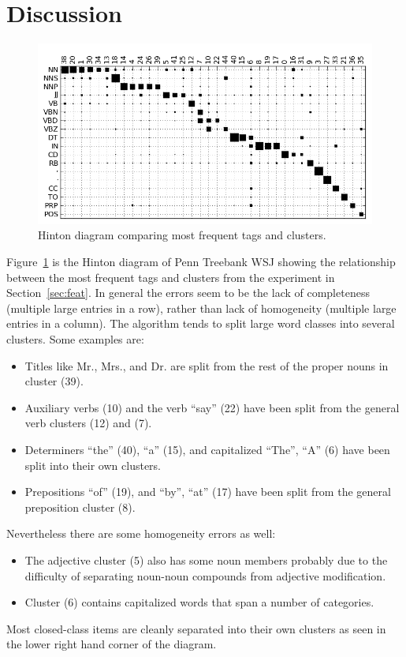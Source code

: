 \section{Discussion}
\label{sec:discuss}
\begin{figure}[ht] \centering
\includegraphics[width=\textwidth]{hinton.png}
\caption{Hinton diagram comparing most frequent tags and clusters.}
\label{plot-hinton}
\end{figure}

Figure~\ref{plot-hinton} is the Hinton diagram of Penn Treebank WSJ
showing the relationship between the most frequent tags and clusters
from the experiment in Section~\ref{sec:feat}.  In general the errors
seem to be the lack of completeness (multiple large entries in a row),
rather than lack of homogeneity (multiple large entries in a column).
The algorithm tends to split large word classes into several clusters.
Some examples are:
\begin{itemize}
\item Titles like Mr., Mrs., and Dr. are split from the rest of the
  proper nouns in cluster (39).
\item Auxiliary verbs (10) and the verb ``say'' (22) have been split
  from the general verb clusters (12) and (7).
\item Determiners ``the'' (40), ``a'' (15), and capitalized
  ``The'', ``A'' (6) have been split into their own clusters.
\item Prepositions ``of'' (19), and ``by'', ``at'' (17) have been
  split from the general preposition cluster (8).
\end{itemize}
Nevertheless there are some homogeneity errors as well:
\begin{itemize} 
\item The adjective cluster (5) also has some noun members probably
  due to the difficulty of separating noun-noun compounds from
  adjective modification.
\item Cluster (6) contains capitalized words that span a number of
  categories.
\end{itemize}
Most closed-class items are cleanly separated into their own clusters
as seen in the lower right hand corner of the diagram. 

